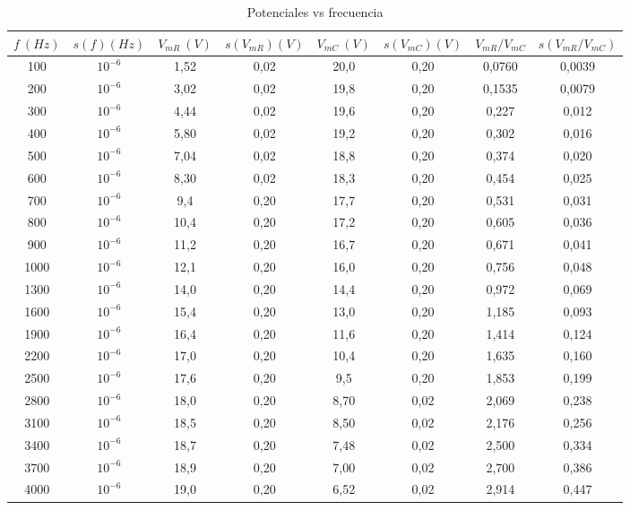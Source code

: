 \documentclass[10pt,a4paper]{article}
\begin{document}
\begin{table} %
\begin{center}
\begin{tabular}{| c | c | c | c | c | c | c | c |} 
\hline$ f  \ (Hz) $ & $ s(f) (Hz) $ & $V_{mR} \ (V)$ & $ s(V_{mR}) (V)$  & $V_{mC} \ (V)$ & $ s(V_{mC}) (V) $ & $V_{mR} / V_{mC} $ & $ s(V_{mR} / V_{mC})$
  \\  \hline
100 & $10^{-6}$ & 1,52 & 0,02 & 20,0 & 0,20 & 0,0760 & 0,0039
  \\ 
200 & $10^{-6}$ & 3,02 & 0,02 & 19,8 & 0,20 & 0,1535 & 0,0079
  \\ 
300 & $10^{-6}$ & 4,44 & 0,02 & 19,6 & 0,20 & 0,227 & 0,012
  \\ 
400 & $10^{-6}$ & 5,80 & 0,02 & 19,2 & 0,20 & 0,302 & 0,016
  \\ 
500 & $10^{-6}$ & 7,04 & 0,02 & 18,8 & 0,20 & 0,374 & 0,020
  \\ 
600 & $10^{-6}$ & 8,30 & 0,02 & 18,3 & 0,20 & 0,454 & 0,025
  \\ 
700 & $10^{-6}$ & 9,4 & 0,20 & 17,7 & 0,20 & 0,531 & 0,031
  \\ 
800 & $10^{-6}$ & 10,4 & 0,20 & 17,2 & 0,20 & 0,605 & 0,036
  \\ 
900 & $10^{-6}$ & 11,2 & 0,20 & 16,7 & 0,20 & 0,671 & 0,041
  \\ 
1000 & $10^{-6}$ & 12,1 & 0,20 & 16,0 & 0,20 & 0,756 & 0,048
  \\ 
1300 & $10^{-6}$ & 14,0 & 0,20 & 14,4 & 0,20 & 0,972 & 0,069
  \\ 
1600 & $10^{-6}$ & 15,4 & 0,20 & 13,0 & 0,20 & 1,185 & 0,093
  \\ 
1900 & $10^{-6}$ & 16,4 & 0,20 & 11,6 & 0,20 & 1,414 & 0,124
  \\ 
2200 & $10^{-6}$ & 17,0 & 0,20 & 10,4 & 0,20 & 1,635 & 0,160
  \\ 
2500 & $10^{-6}$ & 17,6 & 0,20 & 9,5 & 0,20 & 1,853 & 0,199
  \\ 
2800 & $10^{-6}$ & 18,0 & 0,20 & 8,70 & 0,02 & 2,069 & 0,238
  \\ 
3100 & $10^{-6}$ & 18,5 & 0,20 & 8,50 & 0,02 & 2,176 & 0,256
  \\ 
3400 & $10^{-6}$ & 18,7 & 0,20 & 7,48 & 0,02 & 2,500 & 0,334
  \\ 
3700 & $10^{-6}$ & 18,9 & 0,20 & 7,00 & 0,02 & 2,700 & 0,386
  \\ 
4000 & $10^{-6}$ & 19,0 & 0,20 & 6,52 & 0,02 & 2,914 & 0,447
  \\ \hline
\end{tabular}
\label{tabla impedancia  capacitiva}
\caption{Potenciales vs frecuencia}
\end{center}
\end{table}
\end{document}
